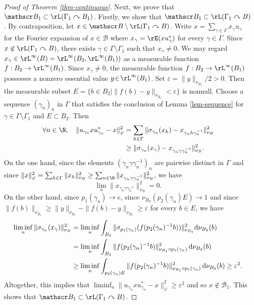 \begin{proof}[Proof of Theorem \ref{thm-continuous}]
Next, we prove that $\mathscr B_1 \subset \rL(\Gamma_1 \curvearrowright B_1)$. Firstly, we show that $\mathscr B_1 \subset \rL(\Gamma_1 \curvearrowright B)$. By contraposition, let $x \in \mathscr B \setminus\rL(\Gamma_1 \curvearrowright B)$. Write $x = \sum_{\gamma \in \Gamma} x_\gamma u_\gamma$ for the Fourier expansion of $x \in \mathscr B$ where $x_\gamma = \rE(xu_\gamma^*)$ for every $\gamma \in \Gamma$. Since $x \not\in \rL(\Gamma_1 \curvearrowright B)$, there exists $\gamma \in \Gamma \setminus \Gamma_1$ such that $x_\gamma \neq 0$. We may regard $x_\gamma \in \rL^\infty(B) = \rL^\infty(B_2, \rL^\infty(B_1))$ as a measurable function $f : B_2 \to \rL^\infty(B_1)$. Since $x_\gamma \neq 0$, the measurable function \hbox{$f : B_2 \to \rL^\infty(B_1)$} possesses a nonzero essential value $y\!\in\!\rL^\infty(B_1)$. Set \hbox{$\varepsilon \!=\! \|y\|_{\nu_{B_1}}/2 \!>\! 0$}. Then the measurable subset $E = \{b \in B_2 \mid \|f(b) - y\|_{\nu_{B_1}} < \varepsilon\}$ is nonnull. Choose a sequence $(\gamma_n)_n$ in $\Gamma$ that satisfies the conclusion of Lemma \ref{lem-sequence} for $\gamma \in \Gamma \setminus \Gamma_1$ and $E \subset B_2$. Then
\begin{align*}
\forall n \in \N, \quad \|u_{\gamma_n} x u_{\gamma_n}^* - x\|_\varphi^2 &= \sum_{h \in \Gamma} \|\sigma_{\gamma_n}(x_h) - x_{\gamma_n h \gamma_n^{-1}}\|_{\nu_B}^2 \\
& \geq \|\sigma_{\gamma_n}(x_\gamma) - x_{\gamma_n \gamma \gamma_n^{-1}}\|_{\nu_B}^2.
\end{align*}
On the one hand, since the elements $(\gamma_n \gamma \gamma_n^{-1})_n$ are pairwise distinct in $\Gamma$ and since $\|x\|_\varphi^2 = \sum_{h \in \Gamma} \|x_h\|_{\nu_B}^2 \geq \sum_{n \in \N} \|x_{\gamma_n \gamma \gamma_n^{-1}}\|_{\nu_B}^2$, we have
\[
\lim_n \|x_{\gamma_n \gamma \gamma_n^{-1}}\|_{\nu_B}^2 = 0.
\]
On the other hand, since $p_1(\gamma_n) \to e$, since $\nu_{B_2}(p_2(\gamma_n) E) \to 1$ and since $\|f(b)\|_{\nu_{B_1}} \geq \|y\|_{\nu_{B_1}} - \|f(b) - y\|_{\nu_{B_1}} \geq \varepsilon$ for every $b \in E$, we have
\begin{align*}
\liminf_n\|\sigma_{\gamma_n}(x_\gamma)\|_{ \nu_B}^2 &= \liminf_n \int_{B_2} \|\sigma_{p_1(\gamma_n)}(f(p_2(\gamma_n)^{-1} b))\|^2_{\nu_{B_1}} {\rm d}\nu_{B_2}(b) \\
&= \liminf_n \int_{B_2} \|f(p_2(\gamma_n)^{-1} b)\|^2_{\nu_{B_1} \circ p_1(\gamma_n)} \, {\rm d}\nu_{B_2}(b) \\
&\geq \liminf_n \int_{p_2(\gamma_n) E} \|f(p_2(\gamma_n)^{-1} b)\|^2_{\nu_{B_1} \circ p_1(\gamma_n)} \, {\rm d}\nu_{B_2}(b) \geq \varepsilon^2.
\end{align*}
Altogether, this implies that $\liminf_n \|u_{\gamma_n} x u_{\gamma_n}^* - x\|_\varphi^2 \geq \varepsilon^2$ and so $x \not\in \mathscr B_1$. This shows that $\mathscr B_1 \subset \rL(\Gamma_1 \curvearrowright B)$.


\end{proof}
